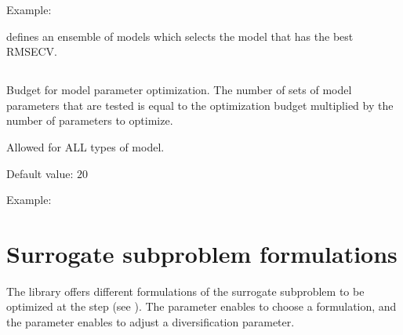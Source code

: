 \documentclass[letterpaper,10pt,english]{sphinxmanual}
\begin{document}
\begin{DUlineblock}{0em}
\item[] Example:
\item[]  defines an ensemble of models which selects the model that has the best RMSECV.
\end{DUlineblock}


\subsection{}
\label{\detokenize{SgteLib:budget}}\label{\detokenize{SgteLib:id32}}
\begin{DUlineblock}{0em}
\item[] Budget for model parameter optimization. The number of sets of model parameters that are tested is equal to the optimization budget multiplied by the number of parameters to optimize.
\item[] Allowed for ALL types of model.
\item[] Default value: \(20\)
\end{DUlineblock}

\begin{DUlineblock}{0em}
\item[] Example:
\item[] 
\item[] 
\end{DUlineblock}


\section{Surrogate subproblem formulations}
\label{\detokenize{SgteLib:surrogate-subproblem-formulations}}
\sphinxAtStartPar
The  library offers different formulations of the surrogate subproblem to be optimized at the  step (see ).
The  parameter enables to choose a formulation, and the parameter  enables to adjust a diversification parameter.
\end{document}
